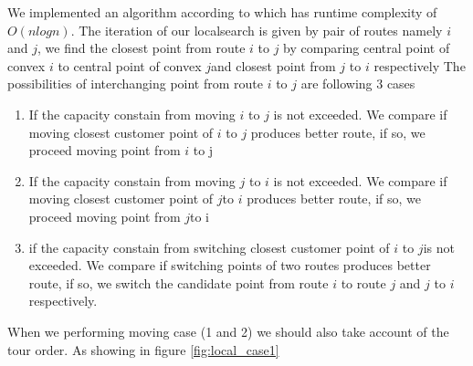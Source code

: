 \documentclass[12pt]{article}
\begin{document}
We implemented an algorithm according to \cite{Berg97} which has runtime complexity of $O(nlogn)$. The iteration of our localsearch is given by pair of routes namely \(i\) and \(j\), we find the closest point from route \(i\) to \(j\) by comparing central point of convex \(i\) to central point of convex \(j\)and closest point from \(j\) to \(i\) respectively The possibilities of interchanging point from route \(i\) to \(j\) are following 3 cases
\begin{enumerate}

	\item If the capacity constain from moving \(i\) to \(j\) is not exceeded. We compare if moving closest customer point of \(i\) to \(j\) produces better route, if so, we proceed moving point from \(i\) to j

	\item If the capacity constain from moving \(j\) to \(i\) is not exceeded. We compare if moving closest customer point of \(j\)to \(i\) produces better route, if so, we proceed moving point from \(j\)to i

	\item if the capacity constain from switching closest customer point of \(i\) to \(j\)is not exceeded. We compare if switching points of two routes produces better route, if so, we switch the candidate point from route \(i\) to route \(j\) and \(j\) to \(i\) respectively.
\end{enumerate}

When we performing moving case (1 and 2) we should also take account of the tour order. As showing in figure \ref{fig:local_case1}
\newline

\begin{figure}[!ht]
	\centering
	\hfill
\end{figure}
\end{document}
